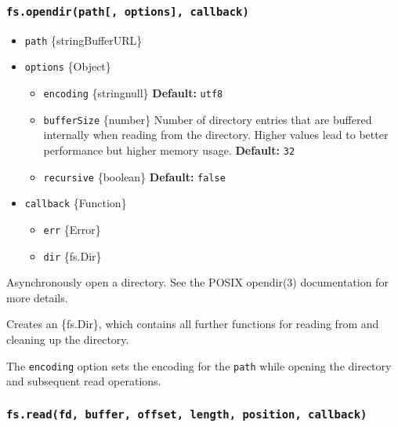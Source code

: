 \subsubsection{\texorpdfstring{\texttt{fs.opendir(path{[},\ options{]},\ callback)}}{fs.opendir(path{[}, options{]}, callback)}}\label{fs.opendirpath-options-callback}

\begin{itemize}
\tightlist
\item
  \texttt{path} \{string\textbar Buffer\textbar URL\}
\item
  \texttt{options} \{Object\}

  \begin{itemize}
  \tightlist
  \item
    \texttt{encoding} \{string\textbar null\} \textbf{Default:}
    \texttt{\textquotesingle{}utf8\textquotesingle{}}
  \item
    \texttt{bufferSize} \{number\} Number of directory entries that are
    buffered internally when reading from the directory. Higher values
    lead to better performance but higher memory usage.
    \textbf{Default:} \texttt{32}
  \item
    \texttt{recursive} \{boolean\} \textbf{Default:} \texttt{false}
  \end{itemize}
\item
  \texttt{callback} \{Function\}

  \begin{itemize}
  \tightlist
  \item
    \texttt{err} \{Error\}
  \item
    \texttt{dir} \{fs.Dir\}
  \end{itemize}
\end{itemize}

Asynchronously open a directory. See the POSIX opendir(3) documentation
for more details.

Creates an \{fs.Dir\}, which contains all further functions for reading
from and cleaning up the directory.

The \texttt{encoding} option sets the encoding for the \texttt{path}
while opening the directory and subsequent read operations.

\subsubsection{\texorpdfstring{\texttt{fs.read(fd,\ buffer,\ offset,\ length,\ position,\ callback)}}{fs.read(fd, buffer, offset, length, position, callback)}}\label{fs.readfd-buffer-offset-length-position-callback}

